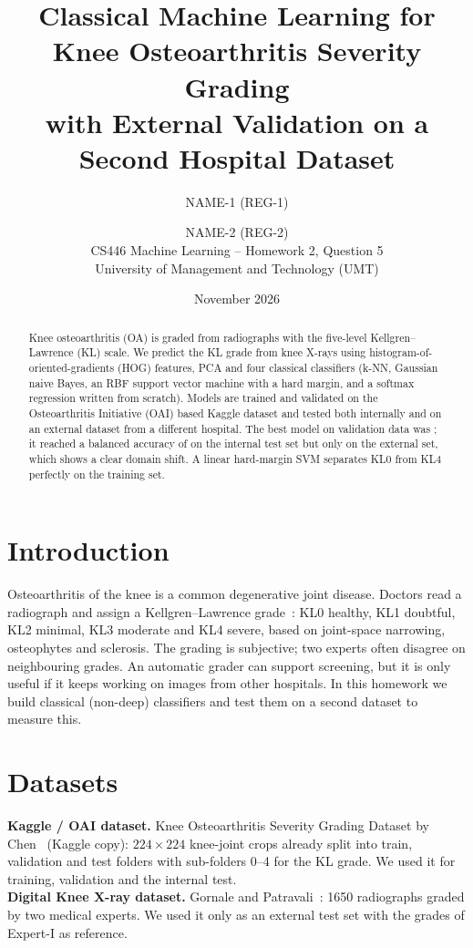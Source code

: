 \documentclass[11pt,a4paper]{article}
\title{Classical Machine Learning for Knee Osteoarthritis Severity Grading\\
\large with External Validation on a Second Hospital Dataset}
\author{NAME-1 (REG-1) \and NAME-2 (REG-2)\\[2pt]
CS446 Machine Learning -- Homework 2, Question 5\\
University of Management and Technology (UMT)}
\date{November 2026}
\begin{document}
\maketitle

\begin{abstract}
Knee osteoarthritis (OA) is graded from radiographs with the five-level Kellgren--Lawrence (KL) scale.
We predict the KL grade from knee X-rays using histogram-of-oriented-gradients (HOG) features, PCA and four
classical classifiers (k-NN, Gaussian naive Bayes, an RBF support vector machine with a hard margin, and a softmax
regression written from scratch). Models are trained and validated on the Osteoarthritis Initiative (OAI) based
Kaggle dataset and tested both internally and on an external dataset from a different hospital. The best model
on validation data was \bestModel{}; it reached a balanced accuracy of \bestKagBA{} on the internal test set but only
\bestDigBA{} on the external set, which shows a clear domain shift. A linear hard-margin SVM separates KL0 from KL4
perfectly on the training set.
\end{abstract}

\section{Introduction}
Osteoarthritis of the knee is a common degenerative joint disease. Doctors read a radiograph and assign a
Kellgren--Lawrence grade~\cite{kl1957}: KL0 healthy, KL1 doubtful, KL2 minimal, KL3 moderate and KL4 severe,
based on joint-space narrowing, osteophytes and sclerosis. The grading is subjective; two experts often disagree
on neighbouring grades. An automatic grader can support screening, but it is only useful if it keeps working on
images from other hospitals. In this homework we build classical (non-deep) classifiers and test them on a
second dataset to measure this.

\section{Datasets}
\textbf{Kaggle / OAI dataset.} Knee Osteoarthritis Severity Grading Dataset by Chen~\cite{chen2018}
(Kaggle copy): $224\times224$ knee-joint crops already split into train, validation and test folders with
sub-folders 0--4 for the KL grade. We used it for training, validation and the internal test.\\
\textbf{Digital Knee X-ray dataset.} Gornale and Patravali~\cite{gornale2020}: 1650 radiographs graded by two
medical experts. We used it only as an external test set with the grades of Expert-I as reference.
\end{document}
